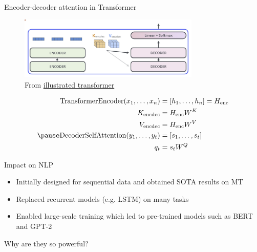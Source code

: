 \documentclass[usenames,dvipsnames,notes,11pt,aspectratio=169,hyperref={colorlinks=true, linkcolor=blue}]{beamer}
\begin{document}
\begin{frame}
    {Encoder-decoder attention in Transformer}

    \begin{figure}
        \includegraphics[height=3cm]{figures/encdec-attn}
        \caption{From \href{https://jalammar.github.io/illustrated-transformer/}{illustrated transformer}}
    \end{figure}

    \vspace{-1cm}
    \begin{align}
        \mathrm{TransformerEncoder}(x_1,\ldots,x_n) &= [h_1,\ldots,h_n] = H_{\text{enc}}\\
        K_{\text{encdec}} &= H_{\text{enc}} W^K \\
        V_{\text{encdec}} &= H_{\text{enc}} W^V \\\pause
        \mathrm{DecoderSelfAttention}(y_1,\ldots,y_t) &= [s_1,\ldots,s_t]\\
        q_t &= s_t W^Q
    \end{align}
\end{frame}

\begin{frame}
    {Impact on NLP}
    \begin{itemize}
        \itemsep1em
        \item Initially designed for sequential data and obtained SOTA results on MT
        \item Replaced recurrent models (e.g. LSTM) on many tasks
        \item Enabled large-scale training which led to pre-trained models such as BERT and GPT-2
    \end{itemize}

    Why are they so powerful?
\end{frame}
\end{document}
